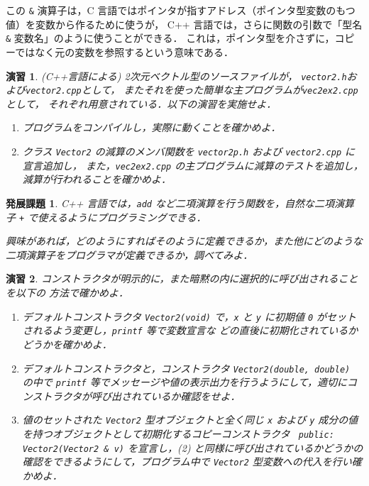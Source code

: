 \documentclass[11pt,a4,epsf]{jarticle}
\newtheorem{exerc}{演習}
\newtheorem{adv}{発展課題}
\begin{document}
この \verb+&+ 演算子は，C 言語ではポインタが指すアドレス（ポインタ型変数のもつ値）を変数から作るために使うが，
C++ 言語では，さらに関数の引数で「型名 \verb+&+ 変数名」のように使うことができる．
これは，ポインタ型を介さずに，コピーではなく元の変数を参照するという意味である．

\begin{exerc} %
(C++言語による) 2次元ベクトル型のソースファイルが，
\verb+vector2.h+および\verb+vector2.cpp+として，
またそれを使った簡単な主プログラムが\verb+vec2ex2.cpp+として，
それぞれ用意されている．以下の演習を実施せよ．

\begin{enumerate}

\item[(1)] プログラムをコンパイルし，実際に動くことを確かめよ．

\item[(2)] クラス \verb+Vector2+ の減算のメンバ関数を
\verb+vector2p.h+ および \verb+vector2.cpp+ に宣言追加し，
また，\verb+vec2ex2.cpp+ の主プログラムに減算のテストを追加し，
減算が行われることを確かめよ．


\end{enumerate}
\end{exerc} %

\begin{adv}
C++ 言語では，\verb+add+ など二項演算を行う関数を，自然な二項演算子 \verb=+= で使えるようにプログラミングできる．

興味があれば，どのようにすればそのように定義できるか，また他にどのような二項演算子をプログラマが定義できるか，調べてみよ．
\end{adv}

\begin{exerc} %
コンストラクタが明示的に，また暗黙の内に選択的に呼び出されることを以下の
方法で確かめよ．
\begin{enumerate}
\item[(1)] 
デフォルトコンストラクタ \verb+Vector2(void)+ で，\verb+x+ と \verb+y+
に初期値 \verb+0+ がセットされるよう変更し，\verb+printf+ 等で変数宣言な
	   どの直後に初期化されているかどうかを確かめよ．
\item[(2)] 
デフォルトコンストラクタと，コンストラクタ
\verb+Vector2(double, double)+ の中で \verb+printf+ 等でメッセージや値の表示出力を行うようにして，適切にコンストラクタが呼び出されているか確認をせよ．
\item[(3)]
値のセットされた \verb+Vector2+ 型オブジェクトと全く同じ \verb+x+ および
\verb+y+ 成分の値を持つオブジェクトとして初期化するコピーコンストラクタ 
\verb/ public: Vector2(Vector2 & v)/ 
を宣言し，(2) と同様に呼び出されているかどうかの確認をできるようにして，プログラム中で
\verb+Vector2+ 型変数への代入を行い確かめよ．
\end{enumerate}

\end{exerc} %
\end{document}

